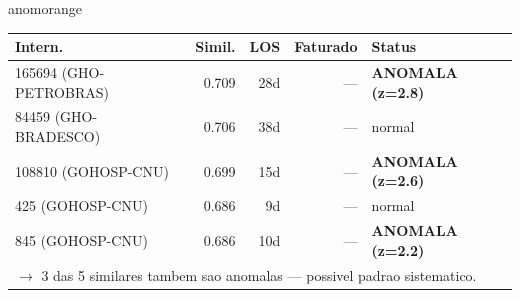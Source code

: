 \documentclass[a4paper,10pt]{article}
\begin{document}
\begin{anomalycard}[Internacao 9292 | GHO-POSTAL | ALTO (z=4.43)]{anomorange}
\begin{tabular}{l r r r l}\toprule\textbf{Intern.} & \textbf{Simil.} & \textbf{LOS} & \textbf{Faturado} & \textbf{Status} \\\midrule
165694 (GHO-PETROBRAS) & 0.709 & 28d & --- & \textcolor{anomred}{\textbf{ANOMALA (z=2.8)}} \\
84459 (GHO-BRADESCO) & 0.706 & 38d & --- & \textcolor{jcubeblue}{normal} \\
108810 (GOHOSP-CNU) & 0.699 & 15d & --- & \textcolor{anomred}{\textbf{ANOMALA (z=2.6)}} \\
425 (GOHOSP-CNU) & 0.686 & 9d & --- & \textcolor{jcubeblue}{normal} \\
845 (GOHOSP-CNU) & 0.686 & 10d & --- & \textcolor{anomred}{\textbf{ANOMALA (z=2.2)}} \\
\multicolumn{5}{l}{\textcolor{anomred}{\small $\rightarrow$ 3 das 5 similares tambem sao anomalas --- possivel padrao sistematico.}} \\
\bottomrule\end{tabular}


\end{anomalycard}

\newpage
\end{document}
